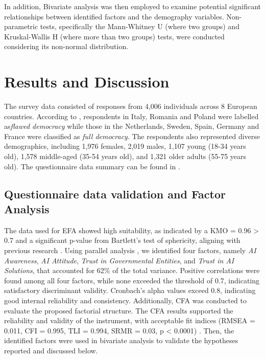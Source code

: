 \documentclass[
]{ceurart}
\begin{document}
In addition, Bivariate analysis was then employed to examine potential significant relationships between identified factors and the demography variables. Non-parametric tests, specifically the Mann-Whitney U (where two groups) \cite{mann1947test} and Kruskal-Wallis H (where more than two groups) \cite{kruskal1952use} tests, were conducted considering its non-normal distribution. 

\section{Results and Discussion}

The survey data consisted of responses from 4,006 individuals across 8 European countries. According to \cite{unit2022democracy}, respondents in Italy, Romania and Poland were labelled as\textit{flawed democracy} while those in the Netherlands, Sweden, Spain, Germany and France were classified as \textit{full democracy}. The respondents also represented diverse demographics, including 1,976 females, 2,019 males, 1,107 young (18-34 years old), 1,578 middle-aged (35-54 years old), and 1,321 older adults (55-75 years old). The questionnaire data summary can be found in \cite{dataSummary}.

\subsection{Questionnaire data validation and Factor Analysis}
The data used for EFA showed high suitability, as indicated by a KMO = 0.96 > 0.7 and a significant p-value from Bartlett's test of sphericity, aligning with previous research \cite{kaiser1974index}.
Using parallel analysis \cite{lim2019determining}, we identified four factors, namely \textit{AI Awareness}, \textit{AI Attitude}, \textit{Trust in Governmental Entities}, and \textit{Trust in AI Solutions}, that accounted for 62\% of the total variance. Positive correlations were found among all four factors, while none exceeded the threshold of 0.7, indicating satisfactory discriminant validity.
Cronbach's alpha values exceed 0.8, indicating good internal reliability and consistency. Additionally, CFA was conducted to evaluate the proposed factorial structure. The CFA results supported the reliability and validity of the instrument, with acceptable fit indices (RMSEA = 0.011, CFI = 0.995, TLI = 0.994, SRMR = 0.03, p < 0.0001) \cite{kline2023principles}. Then, the identified factors were used in bivariate analysis to validate the hypotheses reported and discussed below.
\end{document}
